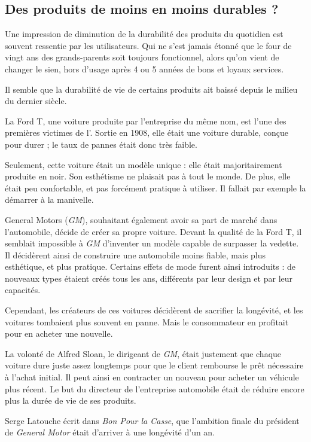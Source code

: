 \subsection{Des produits de moins en moins durables ?}

Une impression de diminution de la durabilité des produits du quotidien est souvent ressentie par les utilisateurs. Qui ne s'est jamais étonné que le four de vingt ans des grands-parents soit toujours fonctionnel, alors qu'on vient de changer le sien, hors d'usage après 4 ou 5 années de bons et loyaux services. 

Il semble que la durabilité de vie de certains produits ait baissé depuis le milieu du dernier siècle. 

\bigbreak
La Ford T, une voiture produite par l'entreprise du même nom, est l'une des premières victimes de l'\op. Sortie en 1908, elle était une voiture durable, conçue pour durer ; le taux de pannes était donc très faible.   


Seulement, cette voiture était un modèle unique : elle était majoritairement produite en noir. Son esthétisme ne plaisait pas à tout le monde. De plus, elle était peu confortable, et pas forcément pratique à utiliser. Il fallait par exemple la démarrer à la manivelle. 

\label{GM}
General Motors (\textit{GM}), souhaitant également avoir sa part de marché dans l'automobile, décide de créer sa propre voiture. Devant la qualité de la Ford T, il semblait impossible à \textit{GM} d'inventer un modèle capable de surpasser la vedette. Il décidèrent ainsi de construire une automobile moins fiable, mais plus esthétique, et plus pratique. Certains effets de mode furent ainsi introduits : de nouveaux types étaient créés tous les ans, différents par leur design et par leur capacités.


Cependant, les créateurs de ces voitures décidèrent de sacrifier la longévité, et les voitures tombaient plus souvent en panne. Mais le consommateur en profitait pour en acheter une nouvelle.


La volonté de Alfred Sloan, le dirigeant de \textit{GM}, était justement que chaque voiture dure juste assez longtemps pour que le client rembourse le prêt nécessaire à l'achat initial.
Il peut ainsi en contracter un nouveau pour acheter un véhicule plus récent. Le but du directeur de l'entreprise automobile était de réduire encore plus la durée de vie de ses produits.

Serge Latouche écrit dans \textit{Bon Pour la Casse}\cite{bpc}, que l'ambition finale du président de \textit{General Motor} était d'arriver à une longévité d'un an.

